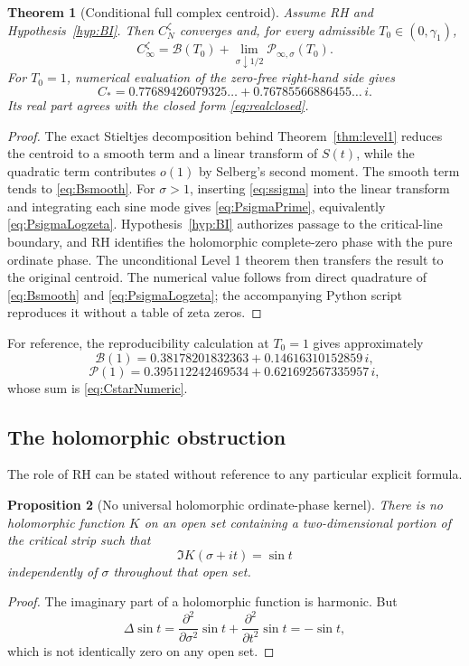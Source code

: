 \documentclass[11pt]{amsart}
\numberwithin{equation}{section}
\newtheorem{theorem}{Theorem}[section]
\newtheorem{proposition}[theorem]{Proposition}
\theoremstyle{definition}
\theoremstyle{remark}
\newcommand{\cP}{\mathcal P}
\newcommand{\cB}{\mathcal B}
\begin{document}
\begin{theorem}[Conditional full complex centroid]\label{thm:fullconstant}
Assume RH and Hypothesis~\ref{hyp:BI}.  Then $C_N^{\zeta}$ converges and, for every admissible $T_0\in(0,\gamma_1)$,
\begin{equation}\label{eq:Cfullformula}
\boxed{
C_\infty^{\zeta}
=\cB(T_0)+\lim_{\sigma\downarrow1/2}\cP_{\infty,\sigma}(T_0).
}
\end{equation}
For $T_0=1$, numerical evaluation of the zero-free right-hand side gives
\begin{equation}\label{eq:CstarNumeric}
\boxed{
C_*=
0.77689426079325\ldots
+0.76785566886455\ldots\,i.
}
\end{equation}
Its real part agrees with the closed form \eqref{eq:realclosed}.
\end{theorem}
\begin{proof}
The exact Stieltjes decomposition behind Theorem~\ref{thm:level1} reduces the centroid to a smooth term and a linear transform of $S(t)$, while the quadratic term contributes $o(1)$ by Selberg's second moment.  The smooth term tends to \eqref{eq:Bsmooth}.  For $\sigma>1$, inserting \eqref{eq:ssigma} into the linear transform and integrating each sine mode gives \eqref{eq:PsigmaPrime}, equivalently \eqref{eq:PsigmaLogzeta}.  Hypothesis~\ref{hyp:BI} authorizes passage to the critical-line boundary, and RH identifies the holomorphic complete-zero phase with the pure ordinate phase.  The unconditional Level 1 theorem then transfers the result to the original centroid.  The numerical value follows from direct quadrature of \eqref{eq:Bsmooth} and \eqref{eq:PsigmaLogzeta}; the accompanying Python script reproduces it without a table of zeta zeros.
\end{proof}

For reference, the reproducibility calculation at $T_0=1$ gives approximately
\[
\cB(1)=0.38178201832363+0.14616310152859\,i,
\]
\[
\cP(1)=0.395112242469534+0.621692567335957\,i,
\]
whose sum is \eqref{eq:CstarNumeric}.

\subsection{The holomorphic obstruction}\label{subsec:holomorphic_obstruction}
The role of RH can be stated without reference to any particular explicit formula.

\begin{proposition}[No universal holomorphic ordinate-phase kernel]\label{prop:nohol}
There is no holomorphic function $K$ on an open set containing a two-dimensional portion of the critical strip such that
\[
\Im K(\sigma+it)=\sin t
\]
independently of $\sigma$ throughout that open set.
\end{proposition}
\begin{proof}
The imaginary part of a holomorphic function is harmonic.  But
\[
\Delta\sin t
=\frac{\partial^2}{\partial\sigma^2}\sin t
+\frac{\partial^2}{\partial t^2}\sin t
=-\sin t,
\]
which is not identically zero on any open set.
\end{proof}
\end{document}

